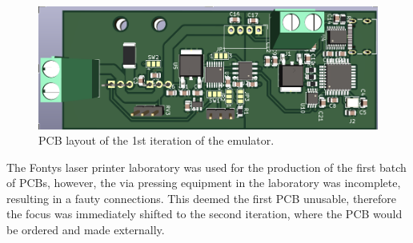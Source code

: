 \begin{figure}[h]
    \centering
    \includegraphics[scale=0.45]{pcb_1st_iteration.png}
    \caption{PCB layout of the 1st iteration of the emulator.}
    \label{fig:1st_pcb}
\end{figure}

The Fontys laser printer laboratory was used for the production 
of the first batch of PCBs, however, the via pressing equipment in the 
laboratory was incomplete, resulting in a fauty connections. 
This deemed the first PCB unusable, therefore the focus was 
immediately shifted to the second iteration, where the PCB 
would be ordered and made externally.
